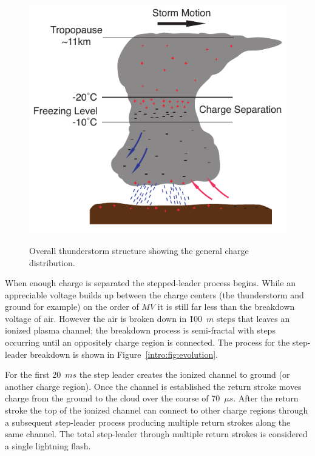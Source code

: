 \begin{figure}[ht!]
	\centering
	\includegraphics[scale=1]{Introduction/Figures/thunderstorm_structure.pdf}\\
	\caption{Overall thunderstorm structure showing the general charge distribution.}
	\label{intro:fig:thunderstorm}
\end{figure}

When enough charge is separated the stepped-leader process begins.
While an appreciable voltage builds up between the charge centers (the thunderstorm and ground for example) on the order of $MV$ it is still far less than the breakdown voltage of air.
However the air is broken down in \~100~$m$ steps that leaves an ionized plasma channel; the breakdown process is semi-fractal with steps occurring until an oppositely charge region is connected.
The process for the step-leader breakdown is shown in Figure~\ref{intro:fig:evolution}.

For the first 20~$ms$ the step leader creates the ionized channel to ground (or another charge region).
Once the channel is established the return stroke moves charge from the ground to the cloud over the course of 70~$\mu s$.
After the return stroke the top of the ionized channel can connect to other charge regions through a subsequent step-leader process producing multiple return strokes along the same channel.
The total step-leader through multiple return strokes is considered a single lightning flash.

